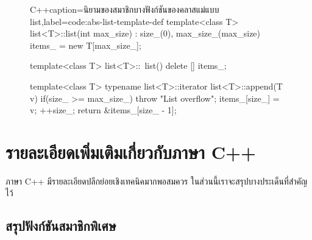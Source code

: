 \begin{figure}
\latintext
\begin{codelist}{C++}{caption={\thaitext นิยาม{\wbr}ของ{\wbr}สมาชิก{\wbr}บาง{\wbr}ฟังก์ชัน{\wbr}ของ{\wbr}ค{\wbr}ลา{\wbr}ส{\wbr}แม่แบบ {\ct list}\latintext},label=code:abs-list-template-def}
template<class T>
list<T>::list(int max_size)
  : size_(0), max_size_(max_size) 
{
  items_ = new T[max_size_];
}

template<class T>
list<T>::~list()
{
  delete [] items_;
}

template<class T>
typename list<T>::iterator list<T>::append(T v)
{
  if(size_ >= max_size_)
    throw "List overflow";
  items_[size_] = v;
  ++size_;
  return &items_[size_ - 1];
}
\end{codelist}
\thaitext
\end{figure}

\section{รายละเอียด{\wbr}เพิ่มเติม{\wbr}เกี่ยวกับ{\wbr}ภาษา C++}

ภาษา C++ มี{\wbr}รายละเอียด{\wbr}ปลีกย่อย{\wbr}เชิง{\wbr}เทคนิค{\wbr}มาก{\wbr}พอสมควร ใน{\wbr}ส่วน{\wbr}นี้{\wbr}เรา{\wbr}จะ{\wbr}สรุป{\wbr}บาง{\wbr}ประเด็น{\wbr}ที่{\wbr}สำคัญ{\wbr}ไว้{\wbr}

\subsection{สรุป{\wbr}ฟังก์ชัน{\wbr}สมาชิกพิเศษ}

